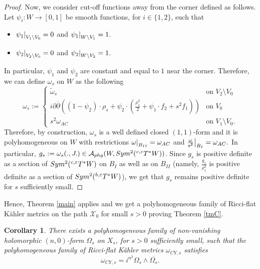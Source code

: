 \documentclass[a4paper,11pt]{article}
\newcounter{mythm}[section]
\newtheorem{cor}[mythm]{Corollary}
\newcommand\restr[2]{{%
  \left.\kern-\nulldelimiterspace %
  #1 %
  \littletaller %
  \right|_{#2} %
  }}
\newcommand{\littletaller}{\mathchoice{\vphantom{\big|}}{}{}{}}
\begin{document}
\begin{proof}
Now, we consider cut-off functions away from the corner defined as follows. Let $\psi_i : W \rightarrow [0,1]$ be smooth functions, for $i \in \{1,2\}$, such that
\begin{itemize}
    \item $\restr{\psi_1}{V_1 \setminus V_0} =0$ and $\restr{\psi_1}{W \setminus V_1}=1$.
    \item $\restr{\psi_2}{V_2 \setminus V_0} =0$ and $\restr{\psi_2}{W \setminus V_2}=1$.
\end{itemize}
In particular, $\psi_1$ and $\psi_2$ are constant and equal to $1$ near the corner. Therefore, we can define $\omega_s$ on $W$ as the following
$$
 \omega_s := 
\begin{cases}
   \tilde \omega_s & \text{on $V_2 \setminus V_0$}\\
   i \partial \overline{\partial} \left( (1-\psi_2) \cdot \rho_s +  \psi_2 \cdot \left(\frac{\rho_1^2}{2} +  \psi_1 \cdot  f_2 + s^2 f_1 \right) \right) & \text{on $V_0$}\\
   s^2 \omega_{AC} & \text{on $V_1 \setminus V_0$}.
\end{cases}
$$
Therefore, by construction, $\omega_s$ is a well defined closed $(1,1)$-form and it is polyhomogeneous on $W$ with restrictions $\restr{\omega}{B_{II}} = \omega_{AC}$ and $\restr{\frac{\omega}{s^2}}{B_I}= \omega_{AC}.$ In particular, $g_s := \omega_s (., J.) \in \mathcal{A}_{phg}(W, Sym^2(\hspace{0.01cm} ^{c,\varepsilon} T^{*} W))$. Since $g_s$ is positive definite as a section of $Sym^2(\hspace{0.01cm} ^{c,\varepsilon} T^{*} W)$ on $B_{I}$ as well as on $B_{II}$ (namely, $\frac{g_s}{\rho_1^2}$ is positive definite as a section of $Sym^2(\hspace{0.01cm} ^{b,\varepsilon} T^{*} W)$), we get that $g_s$ remains positive definite for $s$ sufficiently small.

\end{proof}
Hence, Theorem \ref{main} applies and we get a polyhomogeneous family of Ricci-flat Kähler metrics on the path $\mathcal{X}_0$ for small $s>0$ proving Theorem \ref{tmC}.
\begin{cor}
    There exists a polyhomogeneous family of non-vanishing holomorphic $(n,0)$-form $\Omega_s$ on $X_s$, for $s>0$ sufficiently small, such that the polyhomogeneous family of Ricci-flat Kähler metrics $\omega_{CY,s}$ satisfies
    $$
    \omega_{CY,s} = i^{n^2} \Omega_s \wedge \overline{\Omega_s}.
    $$
\end{cor}
\end{document}
